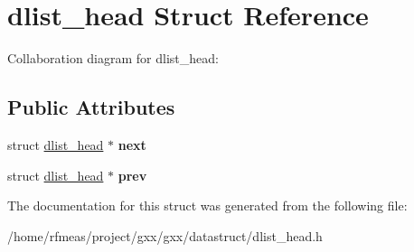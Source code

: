 \hypertarget{structdlist__head}{}\section{dlist\+\_\+head Struct Reference}
\label{structdlist__head}


Collaboration diagram for dlist\+\_\+head\+:
\subsection*{Public Attributes}
\begin{DoxyCompactItemize}
\item 
struct \hyperlink{structdlist__head}{dlist\+\_\+head} $\ast$ {\bfseries next}\hypertarget{structdlist__head_a7d3c90f5d2c2e11b893b01a9e54c9a6e}{}\label{structdlist__head_a7d3c90f5d2c2e11b893b01a9e54c9a6e}

\item 
struct \hyperlink{structdlist__head}{dlist\+\_\+head} $\ast$ {\bfseries prev}\hypertarget{structdlist__head_a7db0715aa084cbedeaf2fa67c9848d35}{}\label{structdlist__head_a7db0715aa084cbedeaf2fa67c9848d35}

\end{DoxyCompactItemize}


The documentation for this struct was generated from the following file\+:\begin{DoxyCompactItemize}
\item 
/home/rfmeas/project/gxx/gxx/datastruct/dlist\+\_\+head.\+h\end{DoxyCompactItemize}
